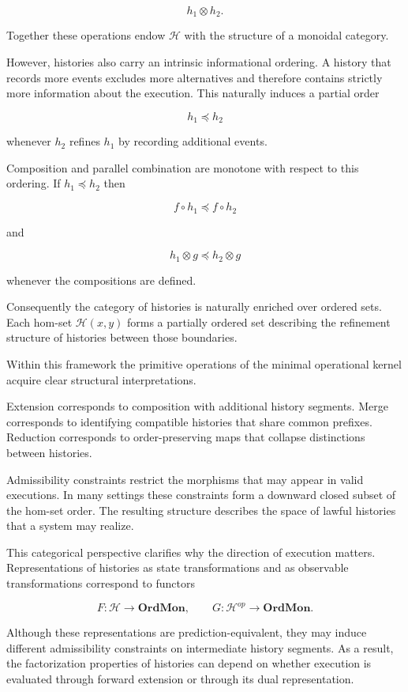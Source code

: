 \documentclass[12pt]{article}
\begin{document}
\[
h_1 \otimes h_2.
\]

Together these operations endow $\mathcal{H}$ with the structure of a
monoidal category.

However, histories also carry an intrinsic informational ordering. A
history that records more events excludes more alternatives and
therefore contains strictly more information about the execution. This
naturally induces a partial order

\[
h_1 \preceq h_2
\]

whenever $h_2$ refines $h_1$ by recording additional events.

Composition and parallel combination are monotone with respect to this
ordering. If $h_1 \preceq h_2$ then

\[
f \circ h_1 \preceq f \circ h_2
\]

and

\[
h_1 \otimes g \preceq h_2 \otimes g
\]

whenever the compositions are defined.

Consequently the category of histories is naturally enriched over
ordered sets. Each hom-set $\mathcal{H}(x,y)$ forms a partially ordered
set describing the refinement structure of histories between those
boundaries.

Within this framework the primitive operations of the minimal
operational kernel acquire clear structural interpretations.

Extension corresponds to composition with additional history segments.
Merge corresponds to identifying compatible histories that share common
prefixes. Reduction corresponds to order-preserving maps that collapse
distinctions between histories.

Admissibility constraints restrict the morphisms that may appear in
valid executions. In many settings these constraints form a downward
closed subset of the hom-set order. The resulting structure describes
the space of lawful histories that a system may realize.

This categorical perspective clarifies why the direction of execution
matters. Representations of histories as state transformations and as
observable transformations correspond to functors

\[
F : \mathcal{H} \to \mathbf{OrdMon}, \qquad
G : \mathcal{H}^{op} \to \mathbf{OrdMon}.
\]

Although these representations are prediction-equivalent, they may
induce different admissibility constraints on intermediate history
segments. As a result, the factorization properties of histories can
depend on whether execution is evaluated through forward extension or
through its dual representation.
\end{document}
